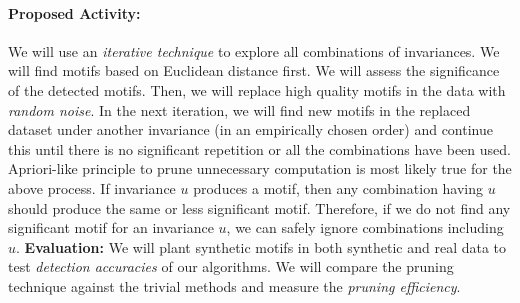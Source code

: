 \paragraph{Proposed Activity:}

We will use an {\it iterative technique} to explore all combinations of invariances. We will find motifs based on Euclidean distance first. We will assess the significance of the detected motifs. Then, we will replace high quality motifs in the data with {\it random noise}. In the next iteration, we will find new motifs in the replaced dataset under another invariance (in an empirically chosen order) and continue this until there is no significant repetition or all the combinations have been used. Apriori-like principle to prune unnecessary computation is most likely true for the above process. If invariance $u$ produces a motif, then any combination having $u$ should produce the same or less significant motif. Therefore, if we do not find any significant motif for an invariance $u$, we can safely ignore combinations including $u$. \textbf{Evaluation:} We will plant synthetic motifs in both synthetic and real data to test {\it detection accuracies} of our algorithms. We will compare the pruning technique against the trivial methods and measure the {\it pruning efficiency}.